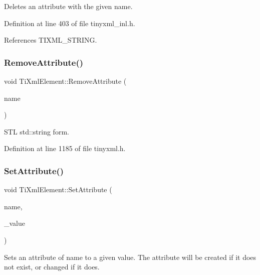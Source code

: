 Deletes an attribute with the given name. 

Definition at line 403 of file tinyxml\+\_\+inl.\+h.



References T\+I\+X\+M\+L\+\_\+\+S\+T\+R\+I\+NG.

\hypertarget{class_ti_xml_element_a1afa6aea716511326a608e4c05df4f3a}{}\label{class_ti_xml_element_a1afa6aea716511326a608e4c05df4f3a} 
\subsubsection{\texorpdfstring{Remove\+Attribute()}{RemoveAttribute()}\hspace{0.1cm}{\footnotesize\ttfamily [2/2]}}
{\footnotesize\ttfamily void Ti\+Xml\+Element\+::\+Remove\+Attribute (\begin{DoxyParamCaption}\item[{const std\+::string \&}]{name }\end{DoxyParamCaption})\hspace{0.3cm}{\ttfamily [inline]}}



S\+TL std\+::string form. 



Definition at line 1185 of file tinyxml.\+h.

\hypertarget{class_ti_xml_element_abf0b3bd7f0e4c746a89ec6e7f101fc32}{}\label{class_ti_xml_element_abf0b3bd7f0e4c746a89ec6e7f101fc32} 
\subsubsection{\texorpdfstring{Set\+Attribute()}{SetAttribute()}\hspace{0.1cm}{\footnotesize\ttfamily [1/4]}}
{\footnotesize\ttfamily void Ti\+Xml\+Element\+::\+Set\+Attribute (\begin{DoxyParamCaption}\item[{const char $\ast$}]{name,  }\item[{const char $\ast$}]{\+\_\+value }\end{DoxyParamCaption})}

Sets an attribute of name to a given value. The attribute will be created if it does not exist, or changed if it does. 

